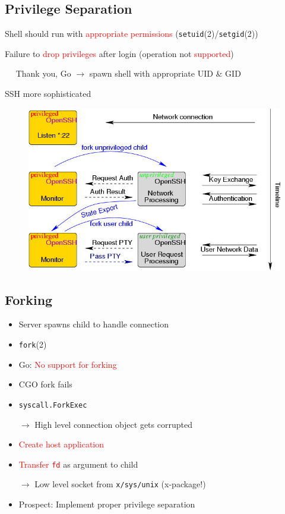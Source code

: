 \documentclass[
	xcolor=dvipsnames,
	handout
]{beamer}
\newenvironment{zhawframe}[1][]
{\begin{frame}[environment=fr,#1]{\insertsubsectionhead}{\insertsectionhead}}
{\end{frame}
}
\begin{document}
\subsection{Privilege Separation}
\begin{zhawframe}
 Shell should run with \textcolor{red}{appropriate permissions} (\texttt{setuid}(2)/\texttt{setgid}(2))

 Failure to \textcolor{red}{drop privileges} after login (operation not \textcolor{red}{supported})

 $\quad$ Thank you, Go $\rightarrow$ spawn shell with appropriate UID \& GID

 SSH more sophisticated
\end{zhawframe}

\begin{zhawframe}
\begin{figure}[ht]
\includegraphics[width=\textwidth]{priv}
\end{figure}
\end{zhawframe}

\subsection{Forking}
\begin{zhawframe}
\begin{itemize}
\item<1-> Server spawns child to handle connection
\item<2-> \texttt{fork}(2)
\item<3-> Go: \textcolor{red}{No support for forking}
\item<4-> CGO fork fails
\item<5-> \texttt{syscall.ForkExec}

$\rightarrow$ High level connection object gets corrupted
\item<7-> \textcolor{red}{Create host application}
\item<8-> \textcolor{red}{Transfer \texttt{fd}} as argument to child

$\rightarrow$ Low level socket from \texttt{x/sys/unix} (x-package!)
\item<10-> Prospect: Implement proper privilege separation
\end{itemize}
\end{zhawframe}
\end{document}
